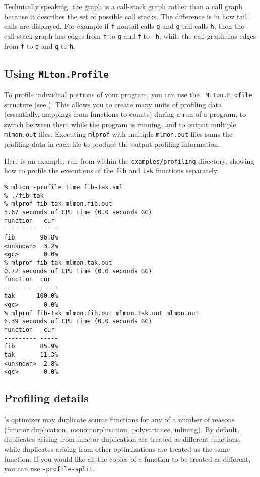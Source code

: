Technically speaking, the graph is a call-stack graph rather than a
call graph because it describes the set of possible call stacks.  The
difference is in how tail calls are displayed.  For example if {\tt f}
nontail calls {\tt g} and {\tt g} tail calls {\tt h}, then the
call-stack graph has edges from {\tt f} to {\tt g} and {\tt f} to {\tt
h}, while the call-graph has edges from {\tt f} to {\tt g} and {\tt g}
to {\tt h}.

\subsection{Using {\tt MLton.Profile}}

To profile individual portions of your program, you can use the {\tt
MLton.Profile} structure (see ).  This
allows you to create many units of profiling data (essentially,
mappings from functions to counts) during a run of a program, to
switch between them while the program is running, and to output
multiple {\tt mlmon.out} files.  Executing {\tt mlprof} with multiple
{\tt mlmon.out} files sums the profiling data in each file to produce
the output profiling information.

Here is an example, run from within the {\tt examples/profiling}
directory, showing how to profile the executions of the {\tt fib} and
{\tt tak} functions separately.

\begin{verbatim}
% mlton -profile time fib-tak.sml
% ./fib-tak
% mlprof fib-tak mlmon.fib.out
5.67 seconds of CPU time (0.0 seconds GC)
function   cur 
--------- -----
fib       96.8%
<unknown>  3.2%
<gc>       0.0%
% mlprof fib-tak mlmon.tak.out
0.72 seconds of CPU time (0.0 seconds GC)
function  cur  
-------- ------
tak      100.0%
<gc>       0.0%
% mlprof fib-tak mlmon.fib.out mlmon.tak.out mlmon.out
6.39 seconds of CPU time (0.0 seconds GC)
function   cur 
--------- -----
fib       85.9%
tak       11.3%
<unknown>  2.8%
<gc>       0.0%
\end{verbatim}

\subsection{Profiling details}

{\mlton}'s optimizer may duplicate source functions for any of a
number of reasons (functor duplication, monomorphisation,
polyvariance, inlining).  By default, duplicates arising from functor
duplication are treated as different functions, while duplicates
arising from other optimizations are treated as the same function.
If you would like all the copies of a function to be treated
as different, you can use {\tt -profile-split}.

